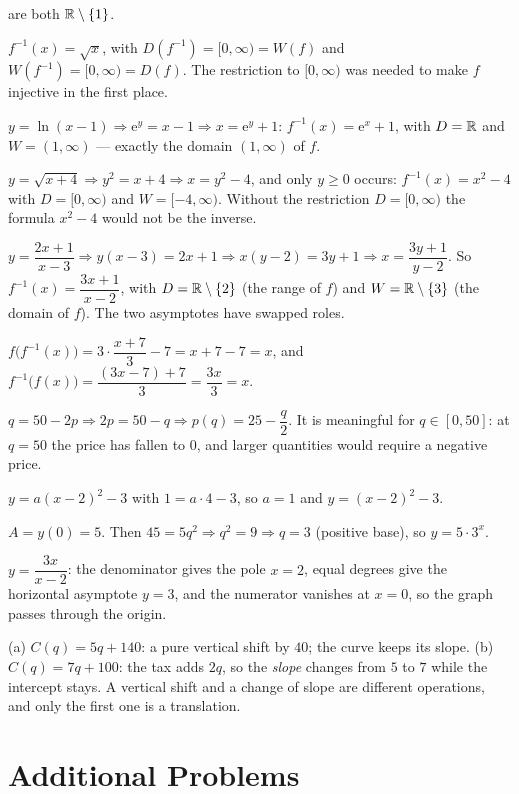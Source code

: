 \begin{solutions}
        are both $\mathbb{R}\setminus\{1\}$.
  \item $f^{-1}(x)=\sqrt{x}$, with $D(f^{-1})=[0,\infty)=W(f)$ and
        $W(f^{-1})=[0,\infty)=D(f)$. The restriction to $[0,\infty)$ was
        needed to make $f$ injective in the first place.
  \item $y=\ln(x-1)\Rightarrow \mathrm{e}^{y}=x-1\Rightarrow
        x=\mathrm{e}^{y}+1$: $f^{-1}(x)=\mathrm{e}^{x}+1$, with $D=\mathbb{R}$ and
        $W=(1,\infty)$ --- exactly the domain $(1,\infty)$ of $f$.
  \item $y=\sqrt{x+4}\Rightarrow y^{2}=x+4\Rightarrow x=y^{2}-4$, and only
        $y\geq0$ occurs: $f^{-1}(x)=x^{2}-4$ with $D=[0,\infty)$ and
        $W=[-4,\infty)$. Without the restriction $D=[0,\infty)$ the formula
        $x^{2}-4$ would not be the inverse.
  \item $y=\dfrac{2x+1}{x-3}\Rightarrow y(x-3)=2x+1\Rightarrow
        x(y-2)=3y+1\Rightarrow x=\dfrac{3y+1}{y-2}$. So
        $f^{-1}(x)=\dfrac{3x+1}{x-2}$, with $D=\mathbb{R}\setminus\{2\}$ (the
        range of $f$) and $W=\mathbb{R}\setminus\{3\}$ (the domain of $f$). The two
        asymptotes have swapped roles.
  \item $f\bigl(f^{-1}(x)\bigr)=3\cdot\dfrac{x+7}{3}-7=x+7-7=x$, and
        $f^{-1}\bigl(f(x)\bigr)=\dfrac{(3x-7)+7}{3}=\dfrac{3x}{3}=x$.
  \item $q=50-2p\Rightarrow 2p=50-q\Rightarrow p(q)=25-\dfrac{q}{2}$. It
        is meaningful for $q\in[0,50]$: at $q=50$ the price has fallen to
        $0$, and larger quantities would require a negative price.
  \item $y=a(x-2)^{2}-3$ with $1=a\cdot4-3$, so $a=1$ and
        $y=(x-2)^{2}-3$.
  \item $A=y(0)=5$. Then $45=5q^{2}\Rightarrow q^{2}=9\Rightarrow q=3$
        (positive base), so $y=5\cdot3^{x}$.
  \item $y=\dfrac{3x}{x-2}$: the denominator gives the pole $x=2$, equal
        degrees give the horizontal asymptote $y=3$, and the numerator
        vanishes at $x=0$, so the graph passes through the origin.
  \item (a) $C(q)=5q+140$: a pure vertical shift by $40$; the curve keeps
        its slope. (b) $C(q)=7q+100$: the tax adds $2q$, so the
        \emph{slope} changes from $5$ to $7$ while the intercept stays.
        A vertical shift and a change of slope are different operations,
        and only the first one is a translation.
\end{solutions}

\section{Additional Problems}

